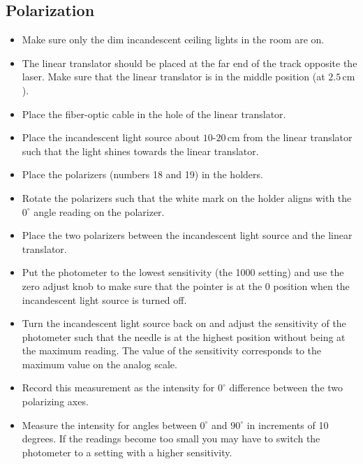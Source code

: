 \subsection{Polarization}
\begin{itemize}
\item Make sure only the dim incandescent ceiling lights in the room are on.

\item The linear translator should be placed at the far end of the track opposite the laser. Make sure that the linear translator is in the middle position (at $2.5\,\mathrm{cm}$).

\item Place the fiber-optic cable in the hole of the linear translator.

\item Place the incandescent light source about $10$-$20\,\mathrm{cm}$ from the linear translator such that the light shines towards the linear translator.

\item Place the polarizers (numbers 18 and 19) in the holders.

\item Rotate the polarizers such that the white mark on the holder aligns with the $0^{\circ}$ angle reading on the polarizer.

\item Place the two polarizers between the incandescent light source and the linear translator.

\item Put the photometer to the lowest sensitivity (the 1000 setting) and use the zero adjust knob to make sure that the pointer is at the 0 position when the incandescent light source is turned off. 

\item Turn the incandescent light source back on and adjust the sensitivity of the photometer such that the needle is at the highest position without being at the maximum reading. The value of the sensitivity corresponds to the maximum value on the analog scale.

\item Record this measurement as the intensity for $0^{\circ}$ difference between the two polarizing axes.

\item Measure the intensity for angles between $0^{\circ}$ and $90^{\circ}$ in increments of 10 degrees. If the readings become too small you may have to switch the photometer to a setting with a higher sensitivity.


\end{itemize}
